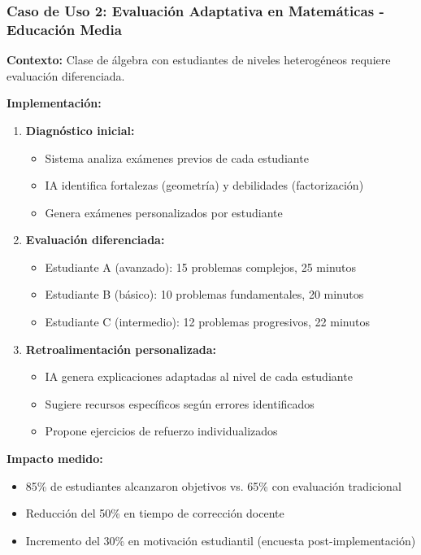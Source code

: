 \documentclass[12pt,a4paper]{report}
\begin{document}
\subsubsection{Caso de Uso 2: Evaluación Adaptativa en Matemáticas - Educación Media}

\textbf{Contexto:} Clase de álgebra con estudiantes de niveles heterogéneos requiere evaluación diferenciada.

\textbf{Implementación:}
\begin{enumerate}
\item \textbf{Diagnóstico inicial:}
   \begin{itemize}
   \item Sistema analiza exámenes previos de cada estudiante
   \item IA identifica fortalezas (geometría) y debilidades (factorización)
   \item Genera exámenes personalizados por estudiante
   \end{itemize}

\item \textbf{Evaluación diferenciada:}
   \begin{itemize}
   \item Estudiante A (avanzado): 15 problemas complejos, 25 minutos
   \item Estudiante B (básico): 10 problemas fundamentales, 20 minutos
   \item Estudiante C (intermedio): 12 problemas progresivos, 22 minutos
   \end{itemize}

\item \textbf{Retroalimentación personalizada:}
   \begin{itemize}
   \item IA genera explicaciones adaptadas al nivel de cada estudiante
   \item Sugiere recursos específicos según errores identificados
   \item Propone ejercicios de refuerzo individualizados
   \end{itemize}
\end{enumerate}

\textbf{Impacto medido:}
\begin{itemize}
\item 85\% de estudiantes alcanzaron objetivos vs. 65\% con evaluación tradicional
\item Reducción del 50\% en tiempo de corrección docente
\item Incremento del 30\% en motivación estudiantil (encuesta post-implementación)
\end{itemize}
\end{document}

